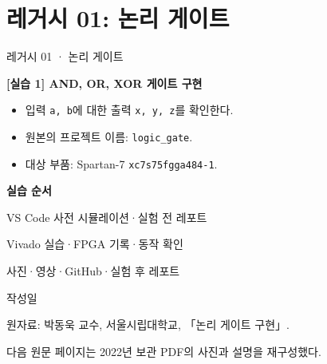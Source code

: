 \section{레거시 01: 논리 게이트}

\begin{frame}[label=legacy-01-vivado]{레거시 01 · 논리 게이트}
\small

{\large\bfseries [실습 1] AND, OR, XOR 게이트 구현}\par\vspace{0.35cm}
\begin{itemize}
\item 입력 \texttt{a, b}에 대한 출력 \texttt{x, y, z}를 확인한다.
\item 원본의 프로젝트 이름: \texttt{logic\_gate}.
\item 대상 부품: Spartan-7 \texttt{xc7s75fgga484-1}.
\end{itemize}
\vspace{0.35cm}
{\color{UOSBlue}\bfseries 실습 순서}\par\vspace{0.12cm}
VS Code 사전 시뮬레이션·실험 전 레포트\par
Vivado 실습·FPGA 기록·동작 확인\par
사진·영상·GitHub·실험 후 레포트
\vspace{0.35cm}\par
{\scriptsize 작성일 \materialdate\quad\presenter\par
원자료: 박동욱 교수, 서울시립대학교, 「논리 게이트 구현」.\par
다음 원문 페이지는 2022년 보관 PDF의 사진과 설명을 재구성했다.}

\end{frame}

